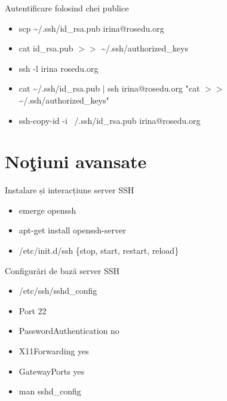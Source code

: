 \documentclass{beamer}
\begin{document}
\begin{frame}{Autentificare folosind chei publice}
  \begin{itemize}
        \item scp \~{}/.ssh/id\_rsa.pub irina@rosedu.org
        \item cat id\_rsa.pub $>>$ \~{}/.ssh/authorized\_keys
	\end{itemize}
	\pause \begin{itemize}
        \item ssh -l irina rosedu.org
    	\item cat \~{}/.ssh/id\_rsa.pub $|$ ssh irina@rosedu.org "cat
$>>$ \~{}/.ssh/authorized\_keys"
	\end{itemize}
	\pause \begin{itemize}
		\item ssh-copy-id -i ~/.ssh/id\_rsa.pub irina@rosedu.org
  \end{itemize}
\end{frame}

\section{No\c{t}iuni avansate}
\frame{\tableofcontents[currentsection]}

\begin{frame}{Instalare și interacțiune server SSH}
  \begin{itemize}
  	\item emerge openssh
    \item apt-get install openssh-server
    \item /etc/init.d/ssh \{stop, start, restart, \pause reload\}
  \end{itemize}
\end{frame}

\begin{frame}{Configurări de bază server SSH}
  \begin{itemize}
    \item /etc/ssh/sshd\_config
    \item Port 22
    \item PasswordAuthentication no
    \item X11Forwarding yes
	\item GatewayPorts yes
    \item man sshd\_config
  \end{itemize}
\end{frame}
\end{document}
